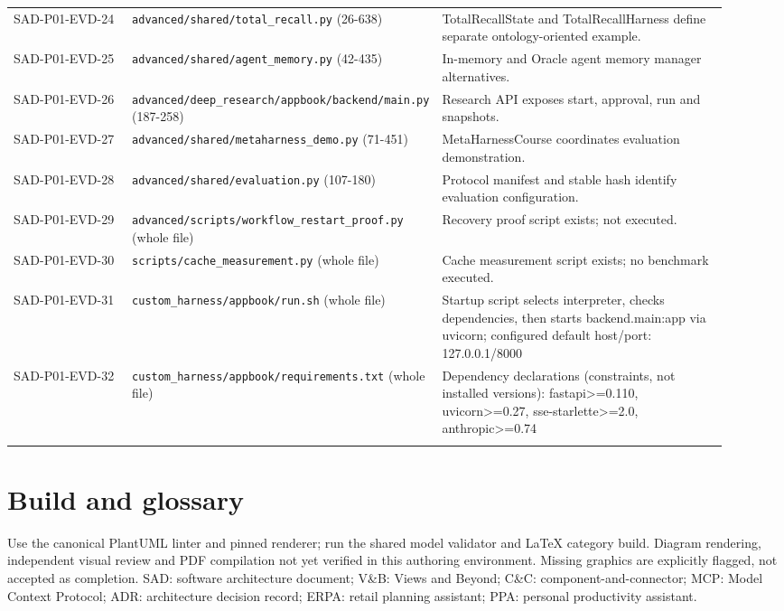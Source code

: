 \documentclass[10pt,letterpaper]{article}
\begin{document}
\begin{longtable}{@{}>{\raggedright\arraybackslash}p{0.17\linewidth}>{\raggedright\arraybackslash}p{0.34\linewidth}>{\raggedright\arraybackslash}p{0.41\linewidth}@{}}
SAD-P01-EVD-24 & \nolinkurl{advanced/shared/total_recall.py} (26-638) & TotalRecallState and TotalRecallHarness define separate ontology-oriented example.\\\addlinespace
SAD-P01-EVD-25 & \nolinkurl{advanced/shared/agent_memory.py} (42-435) & In-memory and Oracle agent memory manager alternatives.\\\addlinespace
SAD-P01-EVD-26 & \nolinkurl{advanced/deep_research/appbook/backend/main.py} (187-258) & Research API exposes start, approval, run and snapshots.\\\addlinespace
SAD-P01-EVD-27 & \nolinkurl{advanced/shared/metaharness_demo.py} (71-451) & MetaHarnessCourse coordinates evaluation demonstration.\\\addlinespace
SAD-P01-EVD-28 & \nolinkurl{advanced/shared/evaluation.py} (107-180) & Protocol manifest and stable hash identify evaluation configuration.\\\addlinespace
SAD-P01-EVD-29 & \nolinkurl{advanced/scripts/workflow_restart_proof.py} (whole file) & Recovery proof script exists; not executed.\\\addlinespace
SAD-P01-EVD-30 & \nolinkurl{scripts/cache_measurement.py} (whole file) & Cache measurement script exists; no benchmark executed.\\\addlinespace
SAD-P01-EVD-31 & \nolinkurl{custom_harness/appbook/run.sh} (whole file) & Startup script selects interpreter, checks dependencies, then starts backend.main:app via uvicorn; configured default host/port: 127.0.0.1/8000\\\addlinespace
SAD-P01-EVD-32 & \nolinkurl{custom_harness/appbook/requirements.txt} (whole file) & Dependency declarations (constraints, not installed versions): fastapi>=0.110, uvicorn>=0.27, sse-starlette>=2.0, anthropic>=0.74\\\addlinespace
\bottomrule\end{longtable}

\section{Build and glossary}
Use the canonical PlantUML linter and pinned renderer; run the shared model validator and LaTeX category build. Diagram rendering, independent visual review and PDF compilation not yet verified in this authoring environment. Missing graphics are explicitly flagged, not accepted as completion. SAD: software architecture document; V\&B: Views and Beyond; C\&C: component-and-connector; MCP: Model Context Protocol; ADR: architecture decision record; ERPA: retail planning assistant; PPA: personal productivity assistant.
\end{document}
